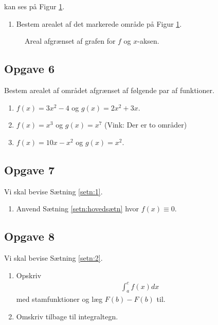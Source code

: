 \documentclass[12pt]{article}
\begin{document}
kan ses på Figur \ref{fig:opg5}.
\begin{enumerate}[label=\roman*)]
	\item Bestem arealet af det markerede område på Figur \ref{fig:opg5}.
\end{enumerate}
\begin{figure}[H]
	\centering
	\caption{Areal afgrænset af grafen for $f$ og $x$-aksen.}
	\label{fig:opg5}
\end{figure}

\newpage

\subsection*{Opgave 6}
Bestem arealet af området afgrænset af følgende par af funktioner.
\begin{enumerate}[label=\roman*)]
	\item $f(x) = 3x^2-4$ og $g(x) = 2x^2 + 3x$.
	\item $f(x) = x^3$ og $g(x) = x^7$ (Vink: Der er to områder)
	\item $f(x) = 10x - x^2$ og $g(x) = x^2$.
\end{enumerate}

\subsection*{Opgave 7}
Vi skal bevise Sætning \ref{setn:1}.
\begin{enumerate}[label=\roman*)]
	\item Anvend Sætning \ref{setn:hovedsætn} hvor $f(x) \equiv 0$.
\end{enumerate}

\subsection*{Opgave 8}
Vi skal bevise Sætning \ref{setn:2}.
\begin{enumerate}[label=\roman*)]
	\item Opskriv
	\begin{align*}
		\int_a^c f(x) dx
	\end{align*} 
	med stamfunktioner og læg $F(b)-F(b)$ til.
	\item Omskriv tilbage til integraltegn.
\end{enumerate}
\end{document}
